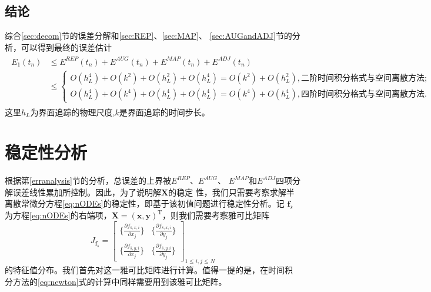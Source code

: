 \documentclass[a4paper,twoside]{ctexart}
\newcommand{\pdfrac}[2]{\frac{\partial #1}{\partial #2}}
\begin{document}
\subsection{结论}
综合\ref{sec:decom}节的误差分解和\ref{sec:REP}、\ref{sec:MAP}、
\ref{sec:AUGandADJ}节的分析，可以得到最终的误差估计
\begin{eqnarray}
  \begin{aligned}
  E_1(t_n) &\le E^{REP}(t_n) + E^{AUG}(t_n) +
  E^{MAP}(t_n) + E^{ADJ}(t_n)\\
  &\le \begin{cases}
 O(h_L^4) + O(k^2) + O(h_L^2) + O(h_L^4) = O(k^2) + O(h_L^2),\text{二阶时间积分格式与空间离散方法;}\\
 O(h_L^4) + O(k^4) + O(h_L^4) + O(h_L^4) = O(k^4) + O(h_L^4),\text{四阶时间积分格式与空间离散方法.}
\end{cases}
  \label{eq:finalerror}
  \end{aligned}
\end{eqnarray}
这里$h_L$为界面追踪的物理尺度,$k$是界面追踪的时间步长。
\section{稳定性分析}
根据第\ref{erranalysis}节的分析，总误差的上界被$E^{REP}$、$E^{AUG}$、
$E^{MAP}$和$E^{ADJ}$四项分解误差线性累加所控制。因此，为了说明解$\boldsymbol X$的稳定
性，我们只需要考察求解半离散常微分方程\eqref{eq:nODEs}的稳定性，即基于该初值问题进行稳定性分析。记
$\boldsymbol f_{\bar{s}}$为方程\eqref{eq:nODEs}的右端项，$\boldsymbol X = (\boldsymbol x ,
\boldsymbol y)^{\text{T}}$，则我们需要考察雅可比矩阵
\begin{equation}
  \label{eq:Jacobi}
 J_{\boldsymbol f_{\bar{s}}} =  \begin{bmatrix}
  \{\pdfrac{f_{\bar{s},x,i}}{x_j}\}& \{\pdfrac{f_{\bar{s},x,i}}{y_j}\}\\
  \{\pdfrac{f_{\bar{s},y,i}}{x_j}\}& \{\pdfrac{f_{\bar{s},y,i}}{y_j}\}
\end{bmatrix}_{1 \le i,j \le N}
\end{equation}
的特征值分布。我们首先对这一雅可比矩阵进行计算。值得一提的是，在时间积
分方法的\eqref{eq:newton}式的计算中同样需要用到该雅可比矩阵。
\end{document}
